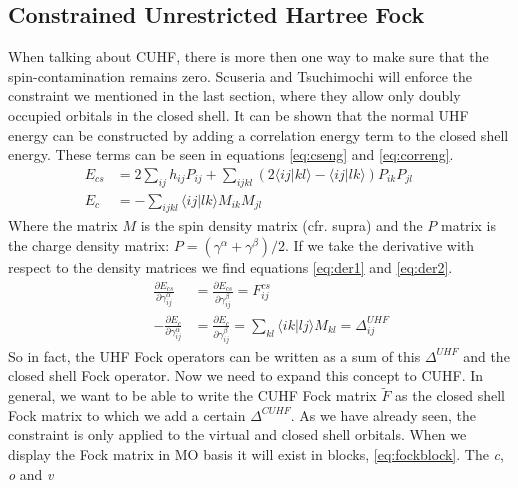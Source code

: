 \documentclass[twoside,twocolumn,9pt]{article}
\begin{document}
\subsection{Constrained Unrestricted Hartree Fock}
When talking about CUHF, there is more then one way to make sure that the spin-contamination remains zero. Scuseria and Tsuchimochi will enforce the constraint we mentioned in the 
last section, where they allow only doubly occupied orbitals in the closed shell\cite{Scuseria2010}. It can be shown that the normal UHF energy can be constructed by adding a 
correlation energy term to the closed shell energy. These terms can be seen in equations \eqref{eq:cseng} and \eqref{eq:correng}\cite{Savin2010}.
\begin{subequations}
  \begin{align}
    \label{eq:cseng}
    E_{cs} &= 2\sum_{ij}h_{ij}P_{ij} + \sum_{ijkl}(2\langle ij|kl\rangle - \langle ij|lk \rangle)P_{ik}P_{jl}&&\\
    \label{eq:correng}
    E_c &= -\sum_{ijkl}\langle ij|lk \rangle M_{ik}M_{jl}&&
  \end{align}
\end{subequations}
Where the matrix $M$ is the spin density matrix (cfr. supra) and the $P$ matrix is the charge density matrix: $P = (\gamma^\alpha + \gamma^\beta)/2$. If we take the 
derivative with respect to the density matrices we find equations \eqref{eq:der1} and \eqref{eq:der2}.
\begin{subequations}
  \begin{align}
    \label{eq:der1}
    &&\frac{\partial E_{cs}}{\partial \gamma^\alpha_{ij}} &= \frac{\partial E_{cs}}{\partial \gamma^\beta_{ij}} = F^{cs}_{ij} \\
    \label{eq:der2}
    &&-\frac{\partial E_c}{\partial \gamma^\alpha_{ij}} &= \frac{\partial E_c}{\partial \gamma^\beta_{ij}} = \sum_{kl} \langle ik|lj \rangle M_{kl} = \Delta^{UHF}_{ij}
  \end{align}
\end{subequations}
So in fact, the UHF Fock operators can be written as a sum of this $\Delta^{UHF}$ and the closed shell Fock operator. Now we need to expand this concept to CUHF. In general, we want
to be able to write the CUHF Fock matrix $\tilde{F}$ as the closed shell Fock matrix to which we add a certain $\Delta^{CUHF}$. As we have already seen, the constraint is only 
applied to the virtual and closed shell orbitals. When we display the Fock matrix in MO basis it will exist in blocks, \eqref{eq:fockblock}. The \textit{c}, \textit{o} and \textit{v} 
\end{document}
